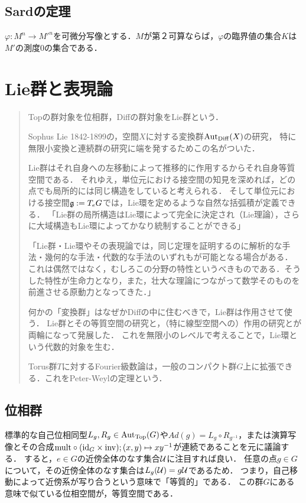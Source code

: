 \documentclass[uplatex,dvipdfmx]{jsreport}
\begin{document}
\section{Sardの定理}

\begin{theorem}
    $\varphi:M^n\to M'^n$を可微分写像とする．$M$が第２可算ならば，$\varphi$の臨界値の集合$K$は$M'$の測度$0$の集合である．
\end{theorem}

\chapter{Lie群と表現論}

\begin{quotation}
    Topの群対象を位相群，Diffの群対象をLie群という．

    Sophus Lie 1842-1899の，空間$X$に対する変換群$\mathrm{Aut}_{\mathrm{Diff}}(X)$の研究，
    特に無限小変換と連続群の研究に端を発するためこの名がついた．

    Lie群はそれ自身への左移動によって推移的に作用するからそれ自身等質空間である．
    それゆえ，単位元における接空間の知見を深めれば，どの点でも局所的には同じ構造をしていると考えられる．
    そして単位元における接空間$\mathfrak{g}:=T_eG$では，Lie環を定めるような自然な括弧積が定義できる．
    「Lie群の局所構造はLie環によって完全に決定され（Lie理論），さらに大域構造もLie環によってかなり統制することができる」\cite{小林}

    「Lie群・Lie環やその表現論では，同じ定理を証明するのに解析的な手法・幾何的な手法・代数的な手法のいずれもが可能となる場合がある．
    これは偶然ではなく，むしろこの分野の特性というべきものである．そうした特性が生命力となり，また，壮大な理論につながって数学そのものを前進させる原動力となってきた．」\cite{小林}

    何かの「変換群」はなぜかDiffの中に住むべきで，Lie群は作用させて使う．
    Lie群とその等質空間の研究と，（特に線型空間への）作用の研究とが両輪になって発展した．
    これを無限小のレベルで考えることで，Lie環という代数的対象を生む．

    Torus群$T$に対するFourier級数論は，一般のコンパクト群$G$上に拡張できる．これをPeter-Weylの定理という．
\end{quotation}

\section{位相群}

\begin{tcolorbox}[colframe=ForestGreen, colback=ForestGreen!10!white,breakable,colbacktitle=ForestGreen!40!white,coltitle=black,fonttitle=\bfseries\sffamily,
title=]
    標準的な自己位相同型$L_g,R_g\in\mathrm{Aut}_{\mathrm{Top}}(G)$や$Ad(g)=L_g\circ R_{g^{-1}}$，または演算写像とその合成$\mathrm{mult}\circ(\mathrm{id}_G\times\mathrm{inv});(x,y)\mapsto xy^{-1}$が連続であることを元に議論する．
    すると，$e\in G$の近傍全体のなす集合$\mathcal{U}$に注目すれば良い．
    任意の点$g\in G$について，その近傍全体のなす集合は$L_g(\mathcal{U})=g\mathcal{U}$であるため．
    つまり，自己移動によって近傍系が写り合うという意味で「等質的」である．
    この群$G$にある意味で似ている位相空間が，等質空間である．
\end{tcolorbox}
\end{document}

